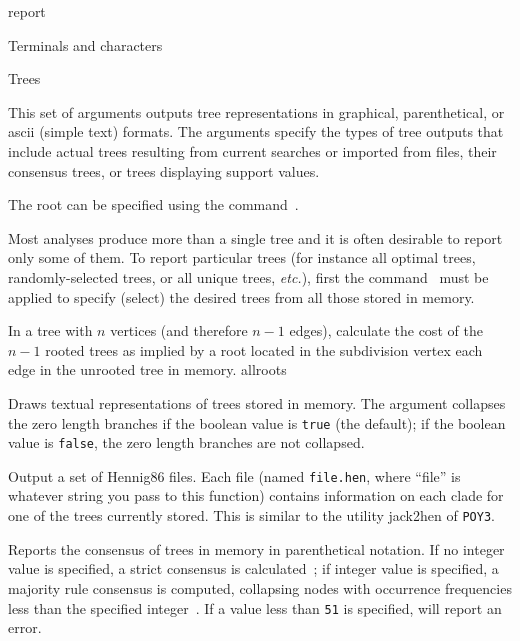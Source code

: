 \begin{command}{report}{}
\begin{arguments}
\begin{argumentgroup}{Terminals and characters}
		\end{argumentgroup}

		\begin{argumentgroup}{Trees}
            {This set of arguments outputs tree representations
            in graphical, parenthetical, or ascii (simple text) formats.
            The arguments specify the types of tree outputs that include
            actual trees resulting from current searches or imported from
            files, their consensus trees, or trees displaying support values.
            
            The root can be specified using the command~.
            
            Most analyses produce more than a single tree and it is
            often desirable to report only some of them. To
            report particular trees (for instance all optimal trees,
            randomly-selected trees, or all unique trees, \emph{etc.}), first the
            command~ must be applied to specify (select)
             the desired trees from all those stored in memory.} 

                {In a tree with $n$ vertices (and therefore $n - 1$ edges),
                calculate the cost of the $n - 1$ rooted trees as implied by a
                root located in the subdivision vertex each edge in the unrooted
                tree in memory.}
                {allroots}

                {Draws textual representations of trees stored in memory. The
                argument  collapses the zero length branches if
                the boolean value is \texttt{true} (the default); if the boolean value is
                \texttt{false}, the zero length branches are not collapsed.}
				{}

	     {Output a set of Hennig86 files. Each file (named \texttt{file.hen},
                where ``file'' is whatever string you pass to this function)
                contains information on each clade for one of the trees
                currently stored. This is similar to the utility jack2hen 
                of \texttt{POY3}.}
				{}

                {Reports the consensus of trees in memory in parenthetical notation.
                If no integer value is
                specified, a strict consensus is calculated~\cite{rohlf1982};
                if integer value is specified,
                a majority rule consensus is computed, collapsing nodes with
                occurrence frequencies less than the specified integer~\cite{margush1981}.
                If a value less
                than \texttt{51} is specified, \poy will report an error.} 
                {}


\end{argumentgroup}
\end{arguments}
\end{command}
